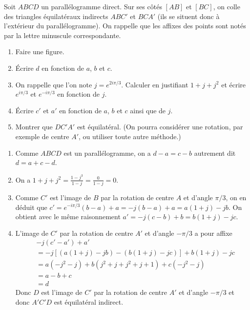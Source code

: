 \begin{exo}
Soit $ABCD$ un parallélogramme direct. Sur ses côtés $[AB]$ et $[BC]$, on colle des triangles équilatéraux indirects $ABC'$ et $BCA'$ (ils se situent donc à l'extérieur du parallélogramme). On rappelle que les affixes des points sont notés par la lettre minuscule correspondante.
\begin{enumerate}
\item Faire une figure.
\item Écrire  $d$ en fonction de $a$, $b$ et $c$.
\item On rappelle que l'on note $j=e^{2i\pi/3}$. Calculer en justifiant $1+j+j^2$ et écrire $e^{i\pi/3}$ et $e^{-i\pi/3}$ en fonction de $j$.
\item Écrire $c'$ et $a'$ en fonction de $a$, $b$ et $c$ ainsi que de $j$.
\item Montrer que $DC'A'$ est équilatéral. (On pourra considérer une rotation, par exemple de centre $A'$, ou utiliser toute autre méthode.)
\end{enumerate}
\begin{sol}
\begin{enumerate}
\item Comme $ABCD$ est un parallélogramme, on a  $d-a=c-b$ autrement dit $d=a+c-d$.
\item On a $1+j+j^2=\frac{1-j^3}{1-j}=\frac{0}{1-j}=0$.
\item Comme $C'$ est l'image de $B$ par la rotation de centre $A$ et d'angle $\pi/3$, on en déduit que $c'=e^{-i\pi/3}(b-a)+a=-j(b-a)+a=a(1+j)-jb$. On obtient avec le même raisonnement $a'=-j(c-b)+b=b(1+j)-jc$.
\item  L'image de $C'$ par la rotation de centre $A'$ et d'angle $-\pi/3$ a pour affixe
\begin{align*}
&-j(c'-a')+a'\\
&=-j\left[(a(1+j)-jb) -(b(1+j)-jc)\right]+b(1+j)-jc \\
&=a\left(-j^2-j\right)+b\left(j^2+j+j^2+j+1\right)+c\left(-j^2-j\right)\\
&= a-b+c\\
&=d
\end{align*}
Donc $D$ est l'image de $C'$ par la rotation de centre $A'$ et d'angle $-\pi/3$ et donc $A'C'D$ est équilatéral indirect.
\end{enumerate}
\end{sol}
\end{exo}





